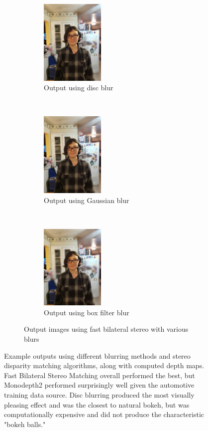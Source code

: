 \documentclass[10pt,twocolumn,letterpaper]{article}
\begin{document}
\begin{figure}[t!]
    \begin{subfigure}[t!]{\textwidth}
        \centering
        \begin{subfigure}[t!]{0.33\textwidth}
            \centering
            \includegraphics[width=1.2in]{bin/output_discblur.jpg}
            \caption{Output using disc blur}
        \end{subfigure}%
        ~
        \begin{subfigure}[t!]{0.33\textwidth}
            \centering
            \includegraphics[width=1.2in]{bin/output_gaussianblur.jpg}
            \caption{Output using Gaussian blur}
        \end{subfigure}%
        ~
        \begin{subfigure}[t!]{0.33\textwidth}
            \centering
            \includegraphics[width=1.2in]{bin/output_boxblur.jpg}
            \caption{Output using box filter blur}
        \end{subfigure}
        \caption*{Output images using fast bilateral stereo with various blurs}
    \end{subfigure}
    \caption{\small Example outputs using different blurring methods and stereo disparity matching algorithms, along with computed depth maps.
    Fast Bilateral Stereo Matching overall performed the best, but Monodepth2 performed surprisingly well given the automotive training data source.
    Disc blurring produced the most visually pleasing effect and was the closest to natural bokeh, but was computationally expensive and did not produce
    the characteristic "bokeh balls."}
    \label{fig:outputs}
\end{figure}
\end{document}
